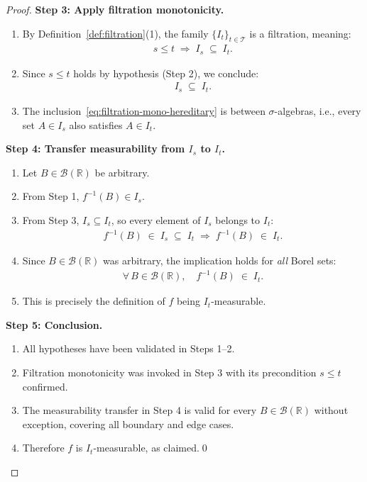 \documentclass[12pt,openany]{book}
\newcommand{\calI}{\mathcal{I}}
\numberwithin{equation}{chapter}
\theoremstyle{plain}
\theoremstyle{definition}
\theoremstyle{remark}
\numberwithin{equation}{chapter}
\theoremstyle{plain}
\def\calI{I}%
\begin{document}
\begin{proof}
\medskip
\noindent\textbf{Step 3: Apply filtration monotonicity.}
\begin{enumerate}
  \item By Definition~\ref{def:filtration}(1), the family
        $\{\calI_t\}_{t \in \mathcal{T}}$ is a filtration, meaning:
        \begin{align}
          s \leq t
          \;\Longrightarrow\;
          \calI_s \;\subseteq\; \calI_t.
        \end{align}
  \item Since $s \leq t$ holds by hypothesis (Step 2), we
        conclude:
        \begin{align}
          \calI_s \;\subseteq\; \calI_t.
          \label{eq:filtration-mono-hereditary}
        \end{align}
  \item The inclusion~\eqref{eq:filtration-mono-hereditary} is
        between $\sigma$-algebras, i.e., every set $A \in \calI_s$
        also satisfies $A \in \calI_t$.
\end{enumerate}

\medskip
\noindent\textbf{Step 4: Transfer measurability from
$\calI_s$ to $\calI_t$.}
\begin{enumerate}
  \item Let $B \in \mathcal{B}(\mathbb{R})$ be arbitrary.
  \item From Step 1, $f^{-1}(B) \in \calI_s$.
  \item From Step 3, $\calI_s \subseteq \calI_t$, so every
        element of $\calI_s$ belongs to $\calI_t$:
        \begin{align}
          f^{-1}(B) \;\in\; \calI_s
          \;\subseteq\; \calI_t
          \;\Longrightarrow\;
          f^{-1}(B) \;\in\; \calI_t.
        \end{align}
  \item Since $B \in \mathcal{B}(\mathbb{R})$ was arbitrary,
        the implication holds for \emph{all} Borel sets:
        \begin{align}
          \forall\, B \in \mathcal{B}(\mathbb{R}),
          \quad
          f^{-1}(B) \;\in\; \calI_t.
        \end{align}
  \item This is precisely the definition of $f$ being
        $\calI_t$-measurable.
\end{enumerate}

\medskip
\noindent\textbf{Step 5: Conclusion.}
\begin{enumerate}
  \item All hypotheses have been validated in Steps 1--2.
  \item Filtration monotonicity was invoked in Step 3 with its
        precondition $s \leq t$ confirmed.
  \item The measurability transfer in Step 4 is valid for every
        $B \in \mathcal{B}(\mathbb{R})$ without exception,
        covering all boundary and edge cases.
  \item Therefore $f$ is $\calI_t$-measurable, as claimed.\qed
\end{enumerate}
\end{proof}
\end{document}
